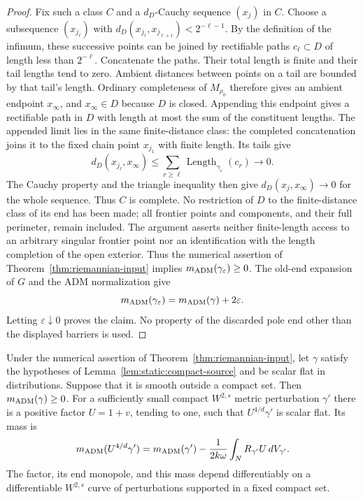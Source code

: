 \begin{proof}
Fix such a class $C$ and a $d_D$-Cauchy sequence $(x_j)$ in $C$.
Choose a subsequence $(x_{j_\ell})$ with
$d_D(x_{j_\ell},x_{j_{\ell+1}})<2^{-\ell-1}$.  By the definition
of the infimum, these successive points can be joined by rectifiable
paths $c_\ell\subset D$ of length less than $2^{-\ell}$.
Concatenate the paths.  Their total length is finite and their tail
lengths tend to zero.  Ambient distances between points on a tail are
bounded by that tail's length.  Ordinary completeness of $M_{\rho_0}$
therefore gives an ambient endpoint $x_\infty$, and $x_\infty\in D$
because $D$ is closed.  Appending this endpoint gives a rectifiable
path in $D$ with length at most the sum of the constituent lengths.
The appended limit lies in the same finite-distance class: the
completed concatenation joins it to the fixed chain point $x_{j_1}$
with finite length.  Its tails give
\[
 d_D(x_{j_\ell},x_\infty)
 \le\sum_{r\ge\ell}\operatorname{Length}_{\gamma_\varepsilon}(c_r)
 \longrightarrow0.
\]
The Cauchy property and the triangle inequality then give
$d_D(x_j,x_\infty)\to0$ for the whole sequence.  Thus $C$ is complete.
No restriction of $D$ to the finite-distance class of its end has been
made; all frontier points and components, and their full perimeter,
remain included.  The argument asserts neither finite-length access
to an arbitrary singular frontier point nor an identification with
the length completion of the open exterior.  Thus the numerical assertion of
Theorem~\ref{thm:riemannian-input} implies
$m_{\rm ADM}(\gamma_\varepsilon)\ge0$.
The old-end expansion of $G$ and the ADM normalization give
\[
 m_{\rm ADM}(\gamma_\varepsilon)
      =m_{\rm ADM}(\gamma)+2\varepsilon.
\]
Letting $\varepsilon\downarrow0$ proves the claim.  No property of
the discarded pole end other than the displayed barriers is used.
\end{proof}

\begin{lemma}
\label{lem:static:rough-nonnegative-mass}
Under the numerical assertion of Theorem~\ref{thm:riemannian-input}, let $\gamma$
satisfy the hypotheses of Lemma~\ref{lem:static:compact-source} and
be scalar flat in distributions.  Suppose that it is smooth outside
a compact set.  Then $m_{\rm ADM}(\gamma)\ge0$.
For a sufficiently small compact $W^{2,s}$ metric perturbation
$\gamma'$ there is a positive factor $U=1+v$, tending to one,
such that $U^{4/d}\gamma'$ is scalar flat.  Its mass is
\begin{equation}
 m_{\rm ADM}(U^{4/d}\gamma')
   =m_{\rm ADM}(\gamma')
     -\frac{1}{2k\omega}\int_N R_{\gamma'}U\,dV_{\gamma'}.
 \label{eq:static:conformal-mass}
\end{equation}
The factor, its end monopole, and this mass depend differentiably
on a differentiable $W^{2,s}$ curve of perturbations supported in a
fixed compact set.
\end{lemma}

